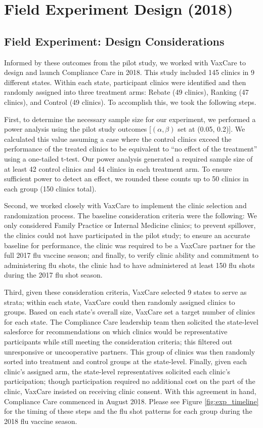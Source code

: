 \section{Field Experiment Design (2018)} \label{app_exp_design}
\subsection{Field Experiment: Design Considerations}
Informed by these outcomes from the pilot study, we worked with VaxCare to design and launch Compliance Care in 2018. This study included 145 clinics in 9 different states. Within each state, participant clinics were identified and then randomly assigned into three treatment arms: Rebate (49 clinics), Ranking (47 clinics), and Control (49 clinics). To accomplish this, we took the following steps. 

First, to determine the necessary sample size for our experiment, we performed a power analysis using the pilot study outcomes [$(\alpha,\beta)$ set at (0.05, 0.2)]. We calculated this value assuming a case where the control clinics exceed the performance of the treated clinics to be equivalent to “no effect of the treatment” using a one-tailed t-test. Our power analysis generated a required sample size of at least 42 control clinics and 44 clinics in each treatment arm. To ensure sufficient power to detect an effect, we rounded these counts up to 50 clinics in each group (150 clinics total).

Second, we worked closely with VaxCare to implement the clinic selection and randomization process. The baseline consideration criteria were the following: We only considered Family Practice or Internal Medicine clinics; to prevent spillover, the clinics could not have participated in the pilot study; to ensure an accurate baseline for performance, the clinic was required to be a VaxCare partner for the full 2017 flu vaccine season; and finally, to verify clinic ability and commitment to administering flu shots, the clinic had to have administered at least 150 flu shots during the 2017 flu shot season. 

Third, given these consideration criteria, VaxCare selected 9 states to serve as strata; within each state, VaxCare could then randomly assigned clinics to groups. Based on each state’s overall size, VaxCare set a target number of clinics for each state. The Compliance Care leadership team then solicited the state-level salesforce for recommendations on which clinics would be representative participants while still meeting the consideration criteria; this filtered out unresponsive or uncooperative partners. This group of clinics was then randomly sorted into treatment and control groups at the state-level. Finally, given each clinic’s assigned arm, the state-level representatives solicited each clinic’s participation; though participation required no additional cost on the part of the clinic, VaxCare insisted on receiving clinic consent. With this agreement in hand, Compliance Care commenced in August 2018. Please see Figure \ref{fig:exp_timeline} for the timing of these steps and the flu shot patterns for each group during the 2018 flu vaccine season. 

